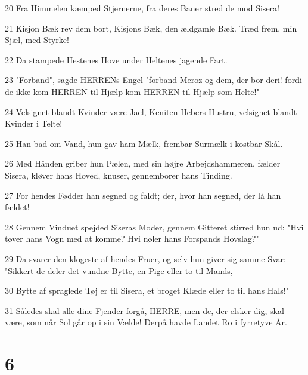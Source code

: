\par 20 Fra Himmelen kæmped Stjernerne, fra deres Baner stred de mod Sisera!
\par 21 Kisjon Bæk rev dem bort, Kisjons Bæk, den ældgamle Bæk. Træd frem, min Sjæl, med Styrke!
\par 22 Da stampede Hestenes Hove under Heltenes jagende Fart.
\par 23 "Forband", sagde HERRENs Engel "forband Meroz og dem, der bor deri! fordi de ikke kom HERREN til Hjælp kom HERREN til Hjælp som Helte!"
\par 24 Velsignet blandt Kvinder være Jael, Keniten Hebers Hustru, velsignet blandt Kvinder i Telte!
\par 25 Han bad om Vand, hun gav ham Mælk, frembar Surmælk i kostbar Skål.
\par 26 Med Hånden griber hun Pælen, med sin højre Arbejdshammeren, fælder Sisera, kløver hans Hoved, knuser, gennemborer hans Tinding.
\par 27 For hendes Fødder han segned og faldt; der, hvor han segned, der lå han fældet!
\par 28 Gennem Vinduet spejded Siseras Moder, gennem Gitteret stirred hun ud: "Hvi tøver hans Vogn med at komme? Hvi nøler hans Forspands Hovslag?"
\par 29 Da svarer den klogeste af hendes Fruer, og selv hun giver sig samme Svar: "Sikkert de deler det vundne Bytte, en Pige eller to til Mands,
\par 30 Bytte af spraglede Tøj er til Sisera, et broget Klæde eller to til hans Hals!"
\par 31 Således skal alle dine Fjender forgå, HERRE, men de, der elsker dig, skal være, som når Sol går op i sin Vælde! Derpå havde Landet Ro i fyrretyve År.

\chapter{6}

